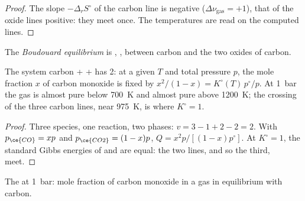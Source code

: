 \begin{proof}
The slope $-\Delta_r S^\circ$ of the carbon line is negative ($\Delta\nu_{\text{gas}}
= +1$), that of the oxide lines positive: they meet once. The temperatures
are read on the computed lines.
\end{proof}

\begin{definition}\label{def:b2:ellingham:boudouard}
The \emph{Boudouard equilibrium} is , , between carbon and the two oxides of carbon.
\end{definition}

\begin{proposition}\label{prop:b2:ellingham:boudouard}
The system carbon +  +  has  2: at a given $T$ and total
pressure $p$, the mole fraction $x$ of carbon monoxide is fixed by $x^2/(1 - x)
= K^\circ(T)\,p^\circ/p$. At \qty{1}{bar} the gas is almost pure 
below \qty{700}{K} and almost pure  above \qty{1200}{K}; the crossing of
the three carbon lines, near \qty{975}{K}, is where $K^\circ = 1$.
\end{proposition}

\begin{proof}
Three species, one reaction, two phases: $v = 3 - 1 + 2 - 2 = 2$. With $p_{\ce{CO}}
= xp$ and $p_{\ce{CO2}} = (1 - x)p$, $Q = x^2p/[(1 - x)p^\circ]$. At $K^\circ = 1$,
the standard Gibbs energies of  and  are
equal: the two lines, and so the third, meet.
\end{proof}

\begin{omfigure}

{\small The  at \qty{1}{bar}: mole fraction of carbon
monoxide in a gas in equilibrium with carbon.}
\end{omfigure}

